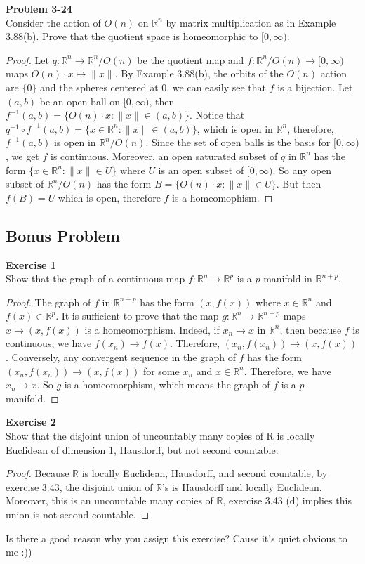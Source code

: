 \documentclass[12pt, a4paper]{article}
\theoremstyle{plain}
\newcommand{\R}{\mathbb{R}}
\newenvironment{exercise}[2][Exercise]
    { \begin{mdframed}[backgroundcolor=gray!20] \textbf{#1 #2} \\}
    {  \end{mdframed}}
\newenvironment{problem}[2][Problem]
    { \begin{mdframed}[backgroundcolor=gray!20] \textbf{#1 #2} \\}
    {  \end{mdframed}}
\begin{document}
\begin{problem}{3-24}
Consider the action of $O(n)$ on $\R^n$ by matrix multiplication as in Example 3.88(b). Prove that the quotient space is homeomorphic to $[0,\infty)$.
\end{problem}
	\begin{proof}
	Let $q:\R^n\rightarrow \R^n/O(n)$ be the quotient map and $f:\R^n/O(n)\rightarrow [0,\infty)$ maps $O(n)\cdot x\mapsto \|x\|$. By Example 3.88(b), the orbits of the $O(n)$ action are $\{0\}$ and the spheres centered at $0$, we can easily see that $f$ is a bijection. Let $(a,b)$ be an open ball on $[0,\infty)$, then $f^{-1}(a,b)=\{O(n)\cdot x:\|x\|\in (a,b)\}$. Notice that $q^{-1}\circ f^{-1}(a,b)=\{x\in \R^n:\|x\|\in (a,b)\}$, which is open in $\R^n$, therefore, $f^{-1}(a,b)$ is open in $\R^n/O(n)$. Since the set of open balls is the basis for $[0,\infty)$, we get $f$ is continuous. Moreover, an open saturated subset of $q$ in $\R^n$ has the form $\{x\in \R^n:\|x\|\in U\}$ where $U$ is an open subset of $[0,\infty)$. So any open subset of $\R^n/O(n)$ has the form $B = \{O(n)\cdot x:\|x\|\in U\}$. But then $f(B)=U$ which is open, therefore $f$ is a homeomophism.
	\end{proof}
\subsection{Bonus Problem}

\begin{exercise}{1}
Show that the graph of a continuous map $f:\R^n\rightarrow \R^p$ is a $p$-manifold in $\R^{n+p}$.
\end{exercise}
	\begin{proof}
	The graph of $f$ in $\R^{n+p}$ has the form $(x,f(x))$ where $x\in \R^n$ and $f(x)\in\R^p$. It is sufficient to prove that the map $g:\R^n\rightarrow \R^{n+p}$ maps $x\rightarrow (x,f(x))$ is a homeomorphism. Indeed, if $x_n\rightarrow x$ in $\R^n$, then because $f$ is continuous, we have $f(x_n)\rightarrow f(x)$. Therefore, $(x_n,f(x_n))\rightarrow (x,f(x))$. Conversely, any convergent sequence in the graph of $f$ has the form $(x_n,f(x_n))\rightarrow (x,f(x))$ for some $x_n$ and $x\in \R^n$. Therefore, we have $x_n\rightarrow x$. So $g$ is a homeomorphism, which means the graph of $f$ is a $p$-manifold.
	\end{proof}
	
\begin{exercise}{2}
Show that the disjoint union of uncountably many copies of R is locally Euclidean of dimension 1, Hausdorff, but not second countable.
\end{exercise}
	\begin{proof}
	Because $\R$ is locally Euclidean, Hausdorff, and second countable, by exercise 3.43, the disjoint union of $\R$'s is Hausdorff and locally Euclidean. Moreover, this is an uncountable many copies of $\R$, exercise 3.43 (d) implies this union is not second countable.
	\end{proof}
	Is there a good reason why you assign this exercise? Cause it's quiet obvious to me :))
	
\end{document}
